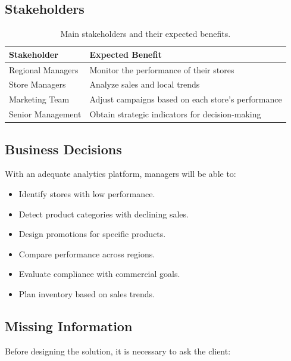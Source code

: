 \documentclass[12pt,a4paper]{article}
\begin{document}
\subsection{Stakeholders}

\begin{table}[H]
\centering
\begin{tabular}{p{4cm} p{9cm}}
\toprule
\textbf{Stakeholder} & \textbf{Expected Benefit}\\
\midrule
Regional Managers & Monitor the performance of their stores\\
Store Managers & Analyze sales and local trends\\
Marketing Team & Adjust campaigns based on each store's performance\\
Senior Management & Obtain strategic indicators for decision-making\\
\bottomrule
\end{tabular}
\caption{Main stakeholders and their expected benefits.}
\end{table}

\subsection{Business Decisions}

With an adequate analytics platform, managers will be able to:
\begin{itemize}[nosep]
    \item Identify stores with low performance.
    \item Detect product categories with declining sales.
    \item Design promotions for specific products.
    \item Compare performance across regions.
    \item Evaluate compliance with commercial goals.
    \item Plan inventory based on sales trends.
\end{itemize}

\subsection{Missing Information}

Before designing the solution, it is necessary to ask the client:
\end{document}
